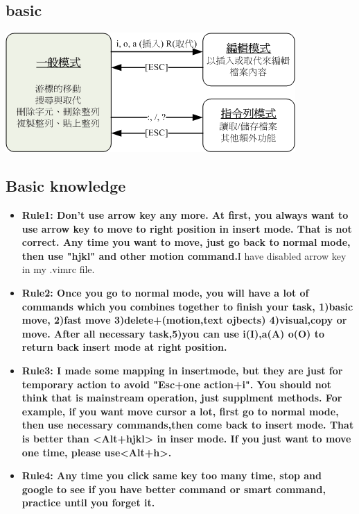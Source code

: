 \documentclass[a4paper,12pt,twoside]{book}
\begin{document}
\begin{itemize}
\section{basic}

\includegraphics[scale=0.8]{pics/vi-mode} \\

\subsection{Basic knowledge}

\begin{itemize}
		\item \textbf{Rule1: Don't use arrow key any more. At first, you always want to use arrow key to move to right position in insert mode. That is not correct. Any time you want to move, just go back to normal mode, then use "hjkl" and other motion command.}I have disabled arrow key in my .vimrc file.

		\item \textbf{Rule2: Once you go to normal mode, you will have a lot of commands which you combines together to finish your task, 1)basic move, 2)fast move 3)delete+(motion,text ojbects) 4)visual,copy or move. After all necessary task,5)you can use i(I),a(A) o(O) to return back insert mode at right position.}

		\item \textbf{Rule3: I made some mapping in insertmode, but they are just for temporary action to avoid "Esc+one action+i". You should not think that is mainstream operation, just supplment methods. For example, if you want move cursor a lot, first go to normal mode, then use necessary commands,then come back to insert mode. That is better than <Alt+hjkl> in inser mode. If you just want to move one time, please use<Alt+h>.}

		\item \textbf{Rule4: Any time you click same key too many time, stop and google to see if you have better command or smart command, practice until you forget it. }


\end{itemize}
\end{itemize}
\end{document}
